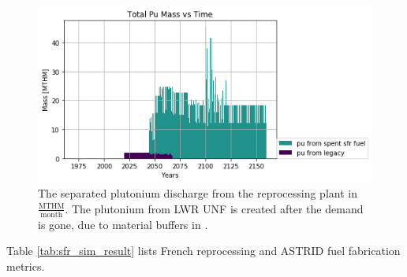 \begin{figure}[htbp!]
    \begin{center}
        \includegraphics[scale=0.7]{./images/french-transition/pu.png}
    \end{center}
    \caption{The separated plutonium discharge from the reprocessing plant 
        in $\frac{\mbox{MTHM}}{\mbox{month}}$. The plutonium from \gls{LWR} \gls{UNF}
        is created after the demand is gone,  due to material buffers in \Cyclus.}
    \label{fig:pu_no_cum}
\end{figure}

Table \ref{tab:sfr_sim_result} lists French reprocessing and 
\gls{ASTRID} fuel fabrication metrics.

